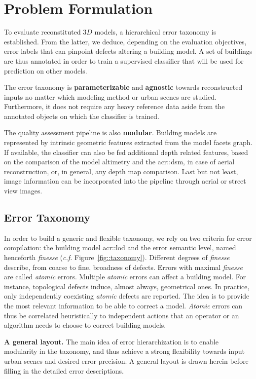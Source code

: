 \documentclass[runningheads]{llncs}
\begin{document}
\section{Problem Formulation}

To evaluate reconstituted $3D$ models, a hierarchical error taxonomy is established. From the latter, we deduce, depending on the evaluation objectives,
error labels that can pinpoint defects altering a building model. A set of buildings are thus annotated in order to train a supervised classifier that will be used for prediction on other models.

The error taxonomy is \textbf{parameterizable} and \textbf{agnostic} towards reconstructed inputs no matter which modeling method or urban scenes are studied. Furthermore, it does not require any heavy reference data aside from the annotated objects on which the classifier is trained.

The quality assessment pipeline is also \textbf{modular}. Building models are represented by intrinsic geometric features extracted from the model facets graph. If available, the classifier can also be fed additional depth related features, based on the comparison of the model altimetry and the \acrfull{acr::dsm}, in case of aerial reconstruction, or, in general, any depth map comparison. Last but not least, image information can be incorporated into the pipeline through aerial or street view images.

\subsection{Error Taxonomy}
In order to build a generic and flexible taxonomy, we rely on two criteria for error compilation: the building model \acrshort{acr::lod} and the error semantic level, named henceforth \textit{finesse} (\textit{c.f.} Figure~\ref{fig::taxonomy}). Different degrees of \textit{finesse} describe, from coarse to fine, broadness of defects. Errors with maximal \textit{finesse} are called \textit{atomic} errors. Multiple \textit{atomic} errors can affect a building model. For instance, topological defects induce, almost always, geometrical ones. In practice, only independently coexisting \textit{atomic} defects are reported. The idea is to provide the most relevant information to be able to correct a model. \textit{Atomic} errors can thus be correlated heuristically to independent actions that an operator or an algorithm needs to choose to correct building models.

\noindent
\textbf{A general layout.}
The main idea of error hierarchization is to enable modularity in the taxonomy, and thus achieve a strong flexibility towards input urban scenes and desired error precision. A general layout is drawn herein before filling in the detailed error descriptions.
\end{document}
